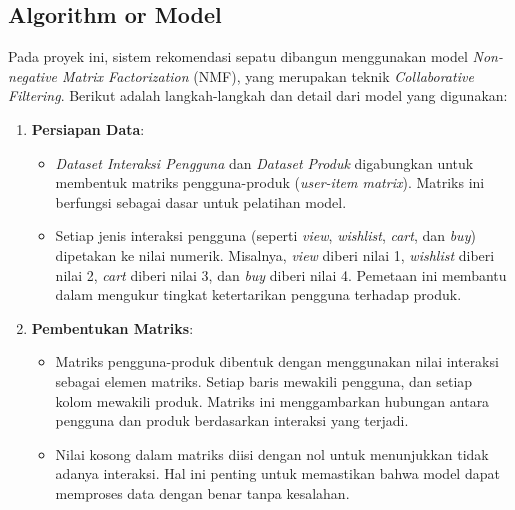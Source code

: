 \documentclass[journal,article,submit,pdftex,moreauthors]{Definitions/mdpi}
\begin{document}
\subsection{Algorithm or Model}
Pada proyek ini, sistem rekomendasi sepatu dibangun menggunakan model \textit{Non-negative Matrix Factorization} (NMF), yang merupakan teknik \textit{Collaborative Filtering}. Berikut adalah langkah-langkah dan detail dari model yang digunakan:

\begin{enumerate}
    \item \textbf{Persiapan Data}:
    \begin{itemize}
        \item \textit{Dataset Interaksi Pengguna} dan \textit{Dataset Produk} digabungkan untuk membentuk matriks pengguna-produk (\textit{user-item matrix}). Matriks ini berfungsi sebagai dasar untuk pelatihan model.
        \item Setiap jenis interaksi pengguna (seperti \textit{view}, \textit{wishlist}, \textit{cart}, dan \textit{buy}) dipetakan ke nilai numerik. Misalnya, \textit{view} diberi nilai 1, \textit{wishlist} diberi nilai 2, \textit{cart} diberi nilai 3, dan \textit{buy} diberi nilai 4. Pemetaan ini membantu dalam mengukur tingkat ketertarikan pengguna terhadap produk.
    \end{itemize}

    \item \textbf{Pembentukan Matriks}:
    \begin{itemize}
        \item Matriks pengguna-produk dibentuk dengan menggunakan nilai interaksi sebagai elemen matriks. Setiap baris mewakili pengguna, dan setiap kolom mewakili produk. Matriks ini menggambarkan hubungan antara pengguna dan produk berdasarkan interaksi yang terjadi.
        \item Nilai kosong dalam matriks diisi dengan nol untuk menunjukkan tidak adanya interaksi. Hal ini penting untuk memastikan bahwa model dapat memproses data dengan benar tanpa kesalahan.
    \end{itemize}


\end{enumerate}
\end{document}
